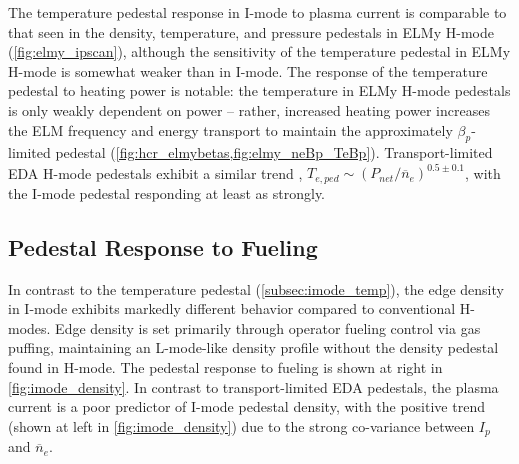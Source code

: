 \begin{figure}
 \pushtooutside
\end{figure}

The temperature pedestal response in I-mode to plasma current is comparable to that seen in the density, temperature, and pressure pedestals in ELMy H-mode (\cf \cref{fig:elmy_ipscan}), although the sensitivity of the temperature pedestal in ELMy H-mode is somewhat weaker than in I-mode.  The response of the temperature pedestal to heating power is notable: the temperature in ELMy H-mode pedestals is only weakly dependent on power -- rather, increased heating power increases the ELM frequency and energy transport to maintain the approximately $\beta_p$-limited pedestal (\cf \cref{fig:hcr_elmybetas,fig:elmy_neBp_TeBp}).  Transport-limited EDA H-mode pedestals exhibit a similar trend \cite{Hubbard2001}, $T_{e,ped} \sim \left(P_{net}/\overline{n}_e\right)^{0.5 \pm 0.1}$, with the I-mode pedestal responding at least as strongly.  

\subsection{Pedestal Response to Fueling}\label{subsec:imode_fueling}

In contrast to the temperature pedestal (\cref{subsec:imode_temp}), the edge density in I-mode exhibits markedly different behavior compared to conventional H-modes.  Edge density is set primarily through operator fueling control via gas puffing, maintaining an L-mode-like density profile without the density pedestal found in H-mode.  The pedestal response to fueling is shown at right in \cref{fig:imode_density}.  In contrast to transport-limited EDA pedestals, the plasma current is a poor predictor of I-mode pedestal density, with the positive trend (shown at left in \cref{fig:imode_density}) due to the strong co-variance between $I_p$ and $\overline{n}_e$.

